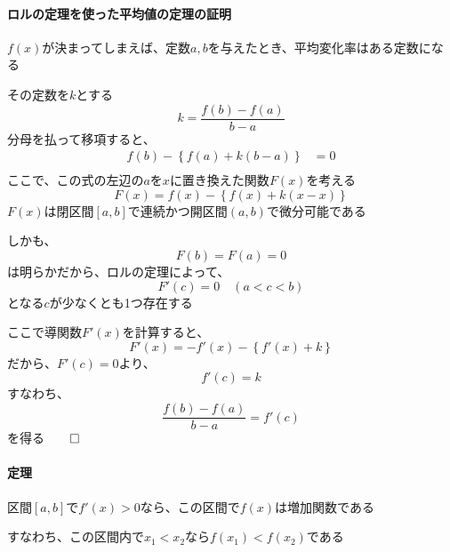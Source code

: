 \documentclass[../book_infinite_continuous_math]{subfiles}
\begin{document}
\br

\paragraph{ロルの定理を使った平均値の定理の証明}\quad

$f(x)$が決まってしまえば、定数$a, b$を与えたとき、平均変化率はある定数になる

その定数を$k$とする
\begin{equation*}
  k = \frac{f(b) - f(a)}{b - a}
\end{equation*}
分母を払って移項すると、
\begin{align*}
  f(b) - \left\{ f(a) + k(b - a) \right\} & = 0 \\
\end{align*}
ここで、この式の左辺の$a$を$x$に置き換えた関数$F(x)$を考える
\begin{equation*}
  F(x) = f(x) - \left\{f(x) + k(x - x)\right\}
\end{equation*}
$F(x)$は閉区間$[a, b]$で連続かつ開区間$(a, b)$で微分可能である

しかも、
\begin{equation*}
  F(b) = F(a) = 0
\end{equation*}
は明らかだから、ロルの定理によって、
\begin{equation*}
  F'(c) = 0 \quad (a < c < b)
\end{equation*}
となる$c$が少なくとも1つ存在する

ここで導関数$F'(x)$を計算すると、
\begin{equation*}
  F'(x) = - f'(x) - \left\{ f'(x) + k \right\}
\end{equation*}
だから、$F'(c) = 0$より、
\begin{equation*}
  f'(c) = k
\end{equation*}
すなわち、
\begin{equation*}
  \frac{f(b) - f(a)}{b - a} = f'(c)
\end{equation*}
を得る$\qed$

\sectionline

\begin{screen}
  \paragraph{定理}
  区間$[a, b]$で$f'(x) > 0$なら、この区間で$f(x)$は増加関数である

  すなわち、この区間内で$x_1 < x_2$なら$f(x_1) < f(x_2)$である
\end{screen}
\end{document}
